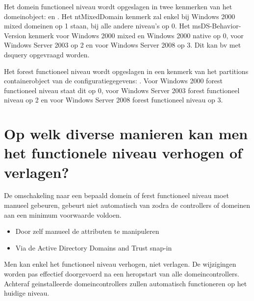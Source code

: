 Het domein functioneel niveau wordt opgeslagen in twee kenmerken van het
domeinobject:  en . Het
ntMixedDomain kenmerk zal enkel bij Windows 2000 mixed domeinen op 1 staan, bij
alle andere niveau's op 0. Het msDS-Behavior-Version kenmerk voor Windows 2000
mixed en Windows 2000 native op 0, voor Windows Server 2003 op 2 en voor Windows
Server 2008 op 3. Dit kan bv met dsquery opgevraagd worden.

Het forest functioneel niveau wordt opgeslagen in een kenmerk van het partitions
containerobject van de configuratiegegevens: .
Voor Windows 2000 forest functioneel niveau staat dit op 0, voor Windows Server
2003 forest functioneel niveau op 2 en voor Windows Server 2008 forest
functioneel niveau op 3.

\section{Op welk diverse manieren kan men het functionele niveau verhogen of
verlagen?}

De omschakeling naar een bepaald domein of ferst functioneel niveau moet manueel
gebeuren, gebeurt niet automatisch van zodra de controllers of domeinen aan een
minimum voorwaarde voldoen.
\begin{itemize}
	\item Door zelf manueel de attributen te manipuleren
	\item Via de Active Directory Domains and Trust snap-in
\end{itemize}
Men kan enkel het functioneel niveau verhogen, niet verlagen. De wijzigingen
worden pas effectief doorgevoerd na een heropstart van alle domeincontrollers.
Achteraf geinstalleerde domeincontrollers zullen automatisch functioneren op het
huidige niveau.
